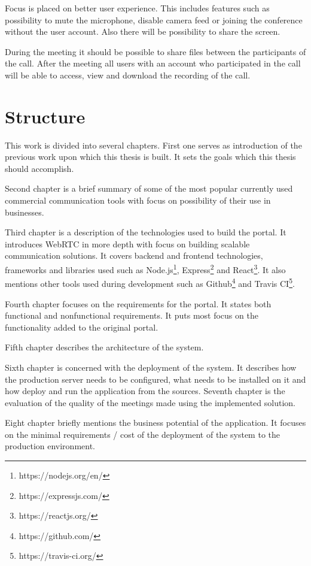 \documentclass[
  digital, %
  table,   %
  lof,     %
  nolot,     %
]{fithesis3}
\begin{document}
Focus is placed on better user experience. This includes features such as possibility to mute the microphone, disable camera feed or joining  the conference without the user account. Also there will be possibility to share the screen.
 
During the meeting it should be possible to share files between the participants of the call. After the meeting all users with an account who participated in the call will be able to access, view and download the recording of the call.

\section{Structure}
This work is divided into several chapters. First one serves as introduction of the previous work upon which this thesis is built. It sets the goals which this thesis should accomplish.

Second chapter is a brief summary of some of the most popular currently used commercial communication tools with focus on possibility of their use in businesses.

Third chapter is a description of the technologies used to build the portal. It introduces WebRTC in more depth with focus on building scalable communication solutions. It covers backend and frontend technologies, frameworks and libraries used such as Node.js\footnote{https://nodejs.org/en/}, Express\footnote{https://expressjs.com/} and React\footnote{https://reactjs.org/}. It also mentions other tools used during development such as Github\footnote{https://github.com/} and Travis CI\footnote{https://travis-ci.org/}.

Fourth chapter focuses on the requirements for the portal. It states both functional and nonfunctional requirements. It puts most focus on the functionality added to the original portal.

Fifth chapter describes the architecture of the system.

Sixth chapter is concerned with the deployment of the system. It describes how the production server needs to be configured, what needs to be installed on it and how deploy and run the application from the sources.
Seventh chapter is the evaluation of the quality of the meetings made using the implemented solution.

Eight chapter briefly mentions the business potential of the application. It focuses on the minimal requirements / cost of the deployment of the system to the production environment.
\end{document}
